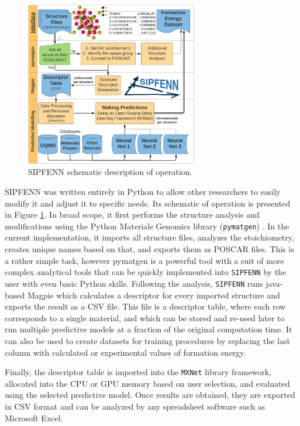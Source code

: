 \begin{figure}[H]
    \centering
    \includegraphics[width=0.67\textwidth]{sipfenn/SIPFENN_GraphicalAbstract_noPerformance.png}
    \caption{SIPFENN schematic description of operation.}
    \label{sipfenn:fig:sipfenn}
\end{figure}

SIPFENN was written entirely in Python to allow other researchers to easily modify it and adjust it to specific needs. Its schematic of operation is presented in Figure \ref{sipfenn:fig:sipfenn}. In broad scope, it first performs the structure analysis and modifications using the Python Materials Genomics library (\texttt{pymatgen}) \cite{Ong2013PythonAnalysis}. In the current implementation, it imports all structure files, analyzes the stoichiometry, creates unique names based on that, and exports them as POSCAR files. This is a rather simple task, however pymatgen is a powerful tool with a suit of more complex analytical tools that can be quickly implemented into \texttt{SIPFENN} by the user with even basic Python skills. Following the analysis, \texttt{SIPFENN} runs java-based Magpie \cite{Ward2016AMaterials} which calculates a descriptor for every imported structure and exports the result as a CSV file. This file is a descriptor table, where each row corresponds to a single material, and which can be stored and re-used later to run multiple predictive models at a fraction of the original computation time. It can also be used to create datasets for training procedures by replacing the last column with calculated or experimental values of formation energy.

Finally, the descriptor table is imported into the \texttt{MXNet} library framework, allocated into the CPU or GPU memory based on user selection, and evaluated using the selected predictive model. Once results are obtained, they are exported in CSV format and can be analyzed by any spreadsheet software such as Microsoft Excel.

